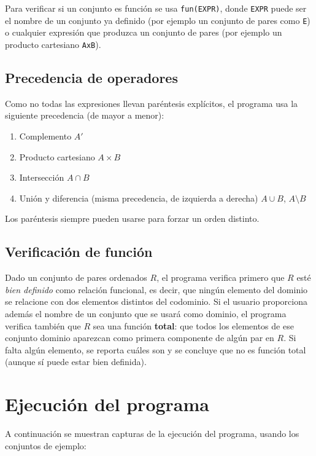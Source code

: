 \documentclass[11pt]{article}
\begin{document}
Para verificar si un conjunto es función se usa \texttt{fun(EXPR)}, donde
\texttt{EXPR} puede ser el nombre de un conjunto ya definido (por ejemplo un conjunto
de pares como \texttt{E}) o cualquier expresión que produzca un conjunto de pares
(por ejemplo un producto cartesiano \texttt{AxB}).

\subsection{Precedencia de operadores}

Como no todas las expresiones llevan paréntesis explícitos, el programa usa la
siguiente precedencia (de mayor a menor):

\begin{enumerate}
  \item Complemento \quad $A'$
  \item Producto cartesiano \quad $A \times B$
  \item Intersección \quad $A \cap B$
  \item Unión y diferencia (misma precedencia, de izquierda a derecha) \quad
  $A \cup B$, \; $A \setminus B$
\end{enumerate}

Los paréntesis siempre pueden usarse para forzar un orden distinto.

\subsection{Verificación de función}

Dado un conjunto de pares ordenados $R$, el programa verifica primero que $R$ esté
\emph{bien definido} como relación funcional, es decir, que ningún elemento del
dominio se relacione con dos elementos distintos del codominio. Si el usuario
proporciona además el nombre de un conjunto que se usará como dominio, el programa
verifica también que $R$ sea una función \textbf{total}: que todos los elementos de
ese conjunto dominio aparezcan como primera componente de algún par en $R$. Si falta
algún elemento, se reporta cuáles son y se concluye que no es función total (aunque
sí puede estar bien definida).

\section{Ejecución del programa}

A continuación se muestran capturas de la ejecución del programa, usando los
conjuntos de ejemplo:
\end{document}
